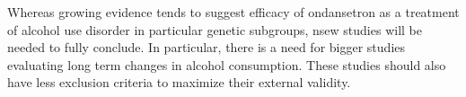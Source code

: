 Whereas growing evidence tends to suggest efficacy of ondansetron as a treatment of alcohol use disorder in particular genetic subgroups, nsew studies will be needed to fully conclude. In particular, there is a need for bigger studies evaluating long term changes in alcohol consumption. These studies should also have less exclusion criteria to maximize their external validity.








